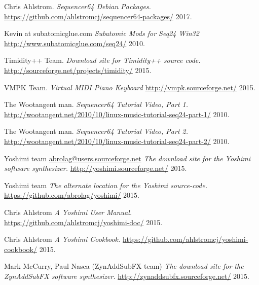 \begin{thebibliography}{99}
   Chris Ahlstrom.
   \emph{Sequencer64 Debian Packages.}
   \url{https://github.com/ahlstromcj/sequencer64-packages/}
   2017.

   Kevin at subatomicglue.com
   \emph{Subatomic Mods for Seq24 Win32}
   \url{http://www.subatomicglue.com/seq24/}
   2010.

   Timidity++ Team.
   \emph{Download site for Timidity++ source code.}
   \url{http://sourceforge.net/projects/timidity/}
   2015.

   VMPK Team.
   \emph{Virtual MIDI Piano Keyboard}
   \url{http://vmpk.sourceforge.net/}
   2015.

   The Wootangent man.
   \emph{Sequencer64 Tutorial Video, Part 1.}
   \url{http://wootangent.net/2010/10/linux-music-tutorial-seq24-part-1/}
   2010.

   The Wootangent man.
   \emph{Sequencer64 Tutorial Video, Part 2.}
   \url{http://wootangent.net/2010/10/linux-music-tutorial-seq24-part-2/}
   2010.

   Yoshimi team \url{abrolag@users.sourceforge.net}
   \emph{The download site for the Yoshimi software synthesizer.}
   \url{http://yoshimi.sourceforge.net/}
   2015.

   Yoshimi team
   \emph{The alternate location for the Yoshimi source-code.}
   \url{https://github.com/abrolag/yoshimi/}
   2015.

   Chris Ahlstrom
   \emph{A Yoshimi User Manual.}
   \url{https://github.com/ahlstromcj/yoshimi-doc/}
   2015.

   Chris Ahlstrom
   \emph{A Yoshimi Cookbook.}
   \url{https://github.com/ahlstromcj/yoshimi-cookbook/}
   2015.

   Mark McCurry, Paul Nasca (ZynAddSubFX team)
   \emph{The download site for the ZynAddSubFX software synthesizer.}
   \url{http://zynaddsubfx.sourceforge.net/}
   2015.

\end{thebibliography}

